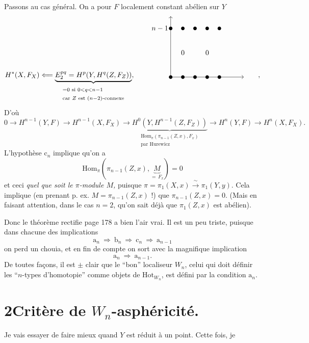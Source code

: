 \documentclass[11pt]{article}
\newcommand{\printedpage}[1]{\marginpar{\footnotesize p.~#1}}
\newcommand{\msp}[1]{\marginpar{\footnotesize [#1]}}
\begin{document}
\printedpage{124}

Passons au cas général. On a pour $F$ localement constant abélien sur $Y$
\[
H^*(X,F_X) \Longleftarrow \underbrace{E_2^{pq} = H^p(Y,H^q(Z,F_Z))}_{\begin{array}{l}\scriptstyle = 0 \text{ si } 0<q<n-1\\ \scriptstyle \text{car } Z \text{ est } (n-2)\text{-connexe}\end{array}}, \qquad
\begin{tikzpicture}[baseline=0pt, x=0.6cm, y=0.6cm]
\draw[->] (0,0) -- (0,5);
\draw[->] (0,0) -- (6,0);
\node[left] at (0,4) {$n-1$};
\foreach \i in {0,...,4} { \fill (\i,4) circle (2.5pt); \fill (\i,0) circle (2.5pt); }
\node at (1,2) {$0$};
\node at (3,2) {$0$};
\end{tikzpicture}
\qquad ,
\]
D’où
\[
0 \longrightarrow H^{n-1}(Y,F) \longrightarrow H^{n-1}(X,F_X) \longrightarrow \underbrace{H^0(Y,H^{n-1}(Z,F_Z))}_{\begin{array}{l}\scriptstyle \mathrm{Hom}_\pi(\pi_{n-1}(Z,x),F_x)\\ \scriptstyle \text{par Hurewicz}\end{array}} \longrightarrow H^n(Y,F) \longrightarrow H^n(X,F_X).
\]
L’hypothèse $\mathrm{c}_n$ implique qu’on a
\msp{page 187}
\[
\mathrm{Hom}_\pi(\pi_{n-1}(Z,x),\underbrace{M}_{=\,F_x}) = 0
\]
et ceci \textit{quel que soit le $\pi$-module $M$,} puisque $\pi = \pi_1(X,x) \xrightarrow{\ \sim\ } \pi_1(Y,y)$. Cela implique (en prenant p. ex. $M = \pi_{n-1}(Z,x)$ !) que $\pi_{n-1}(Z,x)=0$. (Mais en faisant attention, dans le cas $n=2$, qu’on sait déjà que $\pi_1(Z,x)$ est abélien).

Donc le théorème rectifie page 178 a bien l’air vrai. Il est un peu triste, puisque dans chacune des implications %
\[
\mathrm{a}_n \ \Longrightarrow\ \mathrm{b}_n \ \Longrightarrow\ \mathrm{c}_n \ \Longrightarrow\ \mathrm{a}_{n-1}
\]
on perd un chouia, et en fin de compte on sort avec la magnifique implication
\[
\mathrm{a}_n \ \Longrightarrow\ \mathrm{a}_{n-1}.
\]
De toutes façons, il est $\pm$ clair que le “bon” localiseur $W_n$, celui qui doit définir les “$n$-types d’homotopie” comme objets de $\mathrm{Hot}_{W_n}$, est défini par la condition $\mathrm{a}_n$.

\section*{2\quad Critère de $W_n$-asphéricité.}

Je vais essayer de faire mieux quand $Y$ est réduit à un point. Cette fois, je
\end{document}
